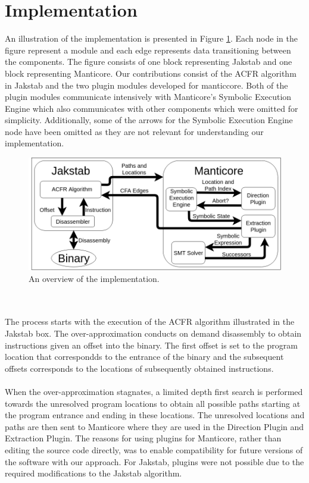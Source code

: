 \documentclass{kththesis}
\newcommand{\fbcomment}[1]{{#1}}
\renewcommand{\fbcomment}[1]{}
\begin{document}
\section{Implementation}
\fbcomment{\color{red}Goal: Describe how Manticore was implemented (Considering to remove this section as I am not sure that is it "scientifically relevant")}
An illustration of the implementation is presented in Figure \ref{fig:implementationOverview}. Each node in the figure represent a module and each edge represents data transitioning between the components. The figure consists of one block representing Jakstab and one block representing Manticore. Our contributions consist of the ACFR algorithm in Jakstab and the two plugin modules developed for manticcore. Both of the plugin modules communicate intensively with Manticore's Symbolic Execution Engine which also communicates with other components which were omitted for simplicity. Additionally, some of the arrows for the Symbolic Execution Engine node have been omitted as they are not relevant for understanding our implementation.
\begin{figure}[!t]
    \centering
    \includegraphics[scale=0.41]{Images/ImplementationOverview.png}
    \caption{An overview of the implementation.}
    \label{fig:implementationOverview}
\end{figure}
\\ \\
The process starts with the execution of the ACFR algorithm illustrated in the Jakstab box. The over-approximation conducts on demand disassembly to obtain instructions given an offset into the binary. The first offset is set to the program location that correspondds to the entrance of the binary and the subsequent offsets corresponds to the locations of subsequently obtained instructions. 
\\ \\
When the over-approximation stagnates, a limited depth first search is performed towards the unresolved program locations to obtain all possible paths starting at the program entrance and ending in these locations. The unresolved locations and paths are then sent to Manticore where they are used in the Direction Plugin and Extraction Plugin. The reasons for using plugins for Manticore, rather than editing the source code directly, was to enable compatibility for future versions of the software with our approach. For Jakstab, plugins were not possible due to the required modifications to the Jakstab algorithm.
\end{document}
